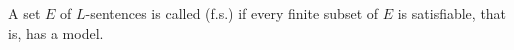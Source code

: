 A set $E$ of $L$-sentences is called  (f.s.) if every finite subset of $E$ is satisfiable, that is, has a model.
